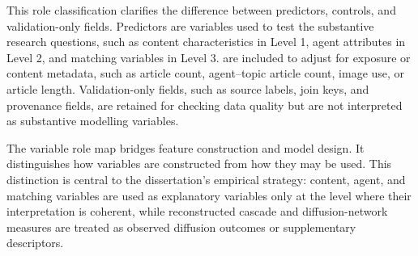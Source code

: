 This role classification clarifies the difference between predictors, controls, and validation-only fields. Predictors are variables used to test the substantive research questions, such as content characteristics in Level 1, agent attributes in Level 2, and matching variables in Level 3.  are included to adjust for exposure or content metadata, such as article count, agent–topic article count, image use, or article length. Validation-only fields, such as source labels, join keys, and provenance fields, are retained for checking data quality but are not interpreted as substantive modelling variables.

The variable role map bridges feature construction and model design. It distinguishes how variables are constructed from how they may be used. This distinction is central to the dissertation’s empirical strategy: content, agent, and matching variables are used as explanatory variables only at the level where their interpretation is coherent, while reconstructed cascade and diffusion-network measures are treated as observed diffusion outcomes or supplementary descriptors.
